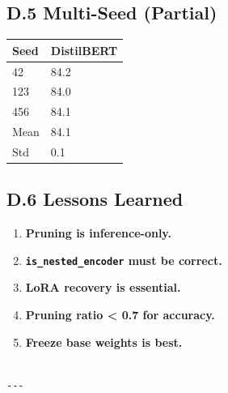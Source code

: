 \subsection{D.5 Multi-Seed (Partial)}

\begin{table}[H]
\centering
\small
\begin{tabular}{ll}
\toprule
\textbf{Seed} & \textbf{DistilBERT} \\
\midrule
42 & 84.2 \\
123 & 84.0 \\
456 & 84.1 \\
Mean & 84.1 \\
Std & 0.1 \\
\bottomrule
\end{tabular}
\end{table}

\subsection{D.6 Lessons Learned}

\begin{enumerate}
\item \textbf{Pruning is inference-only.}
\item \textbf{\texttt{is\_nested\_encoder} must be correct.}
\item \textbf{LoRA recovery is essential.}
\item \textbf{Pruning ratio < 0.7 for accuracy.}
\item \textbf{Freeze base weights is best.}
\end{enumerate}
\begin{lstlisting}

---
\end{lstlisting}